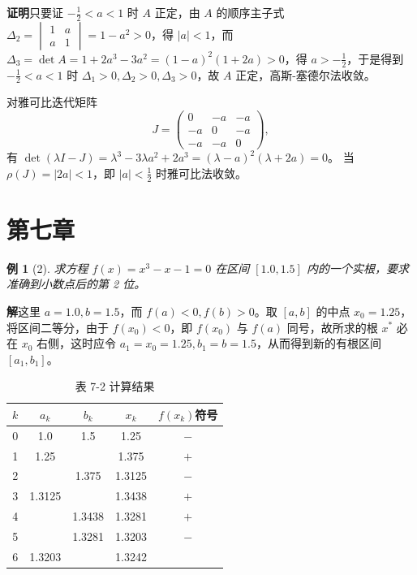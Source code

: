 \documentclass[a4paper,12pt]{ctexart}
\theoremstyle{exampleStyle}
\newtheorem*{example}{例}
\newcommand{\solution}{\par\noindent\textbf{解}\quad}
\newcommand{\prooftext}{\par\noindent\textbf{证明}\quad}
\begin{document}
\prooftext 只要证 $-\frac{1}{2} < a < 1$ 时 $A$ 正定，由 $A$ 的顺序主子式 $\Delta_2 = \begin{vmatrix} 1 & a \\ a & 1 \end{vmatrix} = 1 - a^2 > 0$，得 $|a| < 1$，而 $\Delta_3 = \det A = 1 + 2a^3 - 3a^2 = (1 - a)^2 (1 + 2a) > 0$，得 $a > -\frac{1}{2}$，于是得到 $-\frac{1}{2} < a < 1$ 时 $\Delta_1 > 0, \Delta_2 > 0, \Delta_3 > 0$，故 $A$ 正定，高斯-塞德尔法收敛。

对雅可比迭代矩阵
\[
J = \begin{pmatrix} 0 & -a & -a \\ -a & 0 & -a \\ -a & -a & 0 \end{pmatrix},
\]
有 $\det(\lambda I - J) = \lambda^3 - 3\lambda a^2 + 2a^3 = (\lambda - a)^2 (\lambda + 2a) = 0$。
当 $\rho(J) = |2a| < 1$，即 $|a| < \frac{1}{2}$ 时雅可比法收敛。

\section*{第七章}

\begin{example}[2]
求方程 $f(x) = x^3 - x - 1 = 0$ 在区间 $[1.0, 1.5]$ 内的一个实根，要求准确到小数点后的第 2 位。
\end{example}

\solution 这里 $a=1.0, b=1.5$，而 $f(a) < 0, f(b) > 0$。取 $[a, b]$ 的中点 $x_0 = 1.25$，将区间二等分，由于 $f(x_0) < 0$，即 $f(x_0)$ 与 $f(a)$ 同号，故所求的根 $x^*$ 必在 $x_0$ 右侧，这时应令 $a_1 = x_0 = 1.25, b_1 = b = 1.5$，从而得到新的有根区间 $[a_1, b_1]$。

\begin{table}[H]
\centering
\caption*{表 7-2 计算结果}
\begin{tabular}{c c c c c}
\toprule
$k$ & $a_k$ & $b_k$ & $x_k$ & $f(x_k)$符号 \\
\midrule
0 & 1.0 & 1.5 & 1.25 & $-$ \\
1 & 1.25 & & 1.375 & $+$ \\
2 & & 1.375 & 1.3125 & $-$ \\
3 & 1.3125 & & 1.3438 & $+$ \\
4 & & 1.3438 & 1.3281 & $+$ \\
5 & & 1.3281 & 1.3203 & $-$ \\
6 & 1.3203 & & 1.3242 & \\
\bottomrule
\end{tabular}
\end{table}
\end{document}
